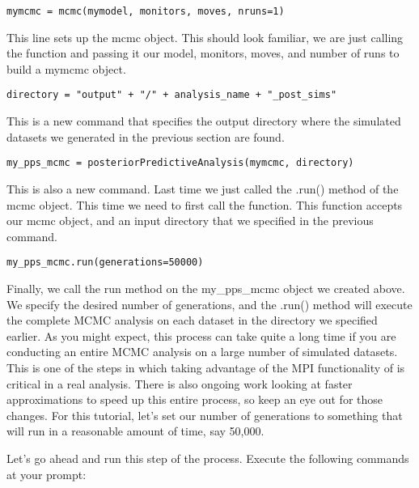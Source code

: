 {\tt \begin{snugshade*}
\begin{lstlisting}
mymcmc = mcmc(mymodel, monitors, moves, nruns=1)
\end{lstlisting}
\end{snugshade*}}
This line sets up the mcmc object. This should look familiar, we are just calling the  function and 
passing it our model, monitors, moves, and number of runs to build a mymcmc object.
{\tt \begin{snugshade*}
\begin{lstlisting}
directory = "output" + "/" + analysis_name + "_post_sims"
\end{lstlisting}
\end{snugshade*}}
This is a new command that specifies the output directory where the simulated datasets we generated in
the previous section are found.
{\tt \begin{snugshade*}
\begin{lstlisting}
my_pps_mcmc = posteriorPredictiveAnalysis(mymcmc, directory)
\end{lstlisting}
\end{snugshade*}}
This is also a new command. Last time we just called the .run() method of the mcmc object. This time 
we need to first call the  function. This function accepts our mcmc object, 
and an input directory that we specified in the previous command. 
{\tt \begin{snugshade*}
\begin{lstlisting}
my_pps_mcmc.run(generations=50000) 
\end{lstlisting}
\end{snugshade*}}
Finally, we call the run method on the my\_pps\_mcmc object we created above. We specify the desired 
number of generations, and the .run() method will execute the complete MCMC analysis on each dataset in 
the directory we specified earlier. As you might expect, this process can take quite a long time if you 
are conducting an entire MCMC analysis on a large number of simulated datasets. This is one of the steps 
in which taking advantage of the MPI functionality of \RevBayes is critical in a real analysis. There is 
also ongoing work looking at faster approximations to speed up this entire process, so keep an eye out 
for those changes. For this tutorial, let's set our number of generations to something that will run in 
a reasonable amount of time, say 50,000. 

Let's go ahead and run this step of the process. Execute the following commands at your \RevBayes prompt: 

